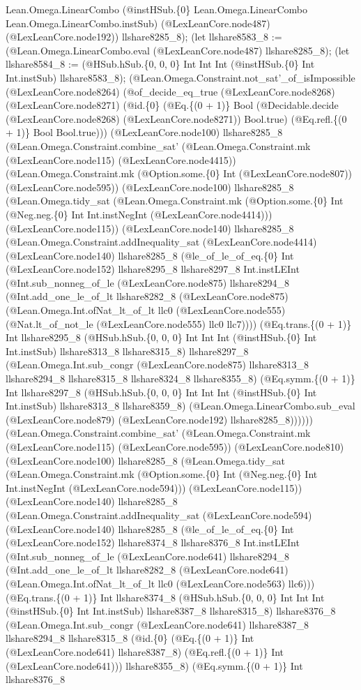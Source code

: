 \documentclass[11pt]{article}
\begin{document}
Lean.Omega.LinearCombo (@instHSub.\{0\} Lean.Omega.LinearCombo Lean.Omega.LinearCombo.instSub) (@LexLeanCore.node487) (@LexLeanCore.node192)) llshare8285\_8); (let llshare8583\_8 := (@Lean.Omega.LinearCombo.eval (@LexLeanCore.node487) llshare8285\_8); (let llshare8584\_8 := (@HSub.hSub.\{0, 0, 0\} Int Int Int (@instHSub.\{0\} Int Int.instSub) llshare8583\_8); (@Lean.Omega.Constraint.not\_sat'\_of\_isImpossible (@LexLeanCore.node8264) (@of\_decide\_eq\_true (@LexLeanCore.node8268) (@LexLeanCore.node8271) (@id.\{0\} (@Eq.\{(0 + 1)\} Bool (@Decidable.decide (@LexLeanCore.node8268) (@LexLeanCore.node8271)) Bool.true) (@Eq.refl.\{(0 + 1)\} Bool Bool.true))) (@LexLeanCore.node100) llshare8285\_8 (@Lean.Omega.Constraint.combine\_sat' (@Lean.Omega.Constraint.mk (@LexLeanCore.node115) (@LexLeanCore.node4415)) (@Lean.Omega.Constraint.mk (@Option.some.\{0\} Int (@LexLeanCore.node807)) (@LexLeanCore.node595)) (@LexLeanCore.node100) llshare8285\_8 (@Lean.Omega.tidy\_sat (@Lean.Omega.Constraint.mk (@Option.some.\{0\} Int (@Neg.neg.\{0\} Int Int.instNegInt (@LexLeanCore.node4414))) (@LexLeanCore.node115)) (@LexLeanCore.node140) llshare8285\_8 (@Lean.Omega.Constraint.addInequality\_sat (@LexLeanCore.node4414) (@LexLeanCore.node140) llshare8285\_8 (@le\_of\_le\_of\_eq.\{0\} Int (@LexLeanCore.node152) llshare8295\_8 llshare8297\_8 Int.instLEInt (@Int.sub\_nonneg\_of\_le (@LexLeanCore.node875) llshare8294\_8 (@Int.add\_one\_le\_of\_lt llshare8282\_8 (@LexLeanCore.node875) (@Lean.Omega.Int.ofNat\_lt\_of\_lt llc0 (@LexLeanCore.node555) (@Nat.lt\_of\_not\_le (@LexLeanCore.node555) llc0 llc7)))) (@Eq.trans.\{(0 + 1)\} Int llshare8295\_8 (@HSub.hSub.\{0, 0, 0\} Int Int Int (@instHSub.\{0\} Int Int.instSub) llshare8313\_8 llshare8315\_8) llshare8297\_8 (@Lean.Omega.Int.sub\_congr (@LexLeanCore.node875) llshare8313\_8 llshare8294\_8 llshare8315\_8 llshare8324\_8 llshare8355\_8) (@Eq.symm.\{(0 + 1)\} Int llshare8297\_8 (@HSub.hSub.\{0, 0, 0\} Int Int Int (@instHSub.\{0\} Int Int.instSub) llshare8313\_8 llshare8359\_8) (@Lean.Omega.LinearCombo.sub\_eval (@LexLeanCore.node879) (@LexLeanCore.node192) llshare8285\_8)))))) (@Lean.Omega.Constraint.combine\_sat' (@Lean.Omega.Constraint.mk (@LexLeanCore.node115) (@LexLeanCore.node595)) (@LexLeanCore.node810) (@LexLeanCore.node100) llshare8285\_8 (@Lean.Omega.tidy\_sat (@Lean.Omega.Constraint.mk (@Option.some.\{0\} Int (@Neg.neg.\{0\} Int Int.instNegInt (@LexLeanCore.node594))) (@LexLeanCore.node115)) (@LexLeanCore.node140) llshare8285\_8 (@Lean.Omega.Constraint.addInequality\_sat (@LexLeanCore.node594) (@LexLeanCore.node140) llshare8285\_8 (@le\_of\_le\_of\_eq.\{0\} Int (@LexLeanCore.node152) llshare8374\_8 llshare8376\_8 Int.instLEInt (@Int.sub\_nonneg\_of\_le (@LexLeanCore.node641) llshare8294\_8 (@Int.add\_one\_le\_of\_lt llshare8282\_8 (@LexLeanCore.node641) (@Lean.Omega.Int.ofNat\_lt\_of\_lt llc0 (@LexLeanCore.node563) llc6))) (@Eq.trans.\{(0 + 1)\} Int llshare8374\_8 (@HSub.hSub.\{0, 0, 0\} Int Int Int (@instHSub.\{0\} Int Int.instSub) llshare8387\_8 llshare8315\_8) llshare8376\_8 (@Lean.Omega.Int.sub\_congr (@LexLeanCore.node641) llshare8387\_8 llshare8294\_8 llshare8315\_8 (@id.\{0\} (@Eq.\{(0 + 1)\} Int (@LexLeanCore.node641) llshare8387\_8) (@Eq.refl.\{(0 + 1)\} Int (@LexLeanCore.node641))) llshare8355\_8) (@Eq.symm.\{(0 + 1)\} Int llshare8376\_8 
\end{document}
